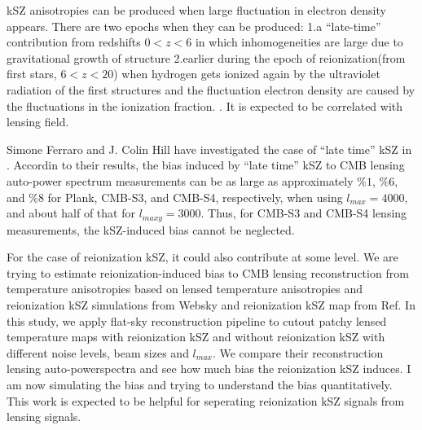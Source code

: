 \documentclass[12pt, notitlepage, onecolumn, amsmath, amssymb, aps]{revtex4-1}
\begin{document}
kSZ anisotropies can be produced when large fluctuation in electron density appears. There are two epochs when they can be produced: 1.a ``late-time'' contribution from redshifts \(0<z<6\) in which inhomogeneities are large due to gravitational growth of structure 2.earlier during the epoch of reionization(from first stars, \(6<z<20\)) when hydrogen gets ionized again by the ultraviolet radiation of the first structures and the fluctuation electron density are caused by the fluctuations in the ionization fraction.\cite{Ferraro:2017fac} \cite{Alvarez:2015xzu}. It is expected to be correlated with lensing field.

Simone Ferraro and J. Colin Hill  have investigated the case of ``late time'' kSZ in \cite{Ferraro:2017fac}. Accordin to their results, the bias induced by ``late time'' kSZ to CMB lensing auto-power spectrum measurements can be as large as approximately \(\%1\), \(\%6\), and \(\%8\) for Plank, CMB-S3, and CMB-S4, respectively, when using \(l_{max} = 4000\), and about half of that for \(l_{maxy} = 3000\). Thus, for CMB-S3 and CMB-S4 lensing measurements, the kSZ-induced bias cannot be neglected.

For the case of reionization kSZ, it could also contribute at some level. We are trying to estimate reionization-induced bias to CMB lensing reconstruction from temperature anisotropies based on lensed temperature anisotropies and reionization kSZ simulations from Websky\cite{Stein:2020its} and reionization kSZ map from Ref\cite{Alvarez:2015xzu}. In this study, we apply flat-sky reconstruction pipeline to cutout patchy lensed temperature maps with reionization kSZ and without reionization kSZ with different noise levels, beam sizes and \(l_{max}\). We compare their reconstruction lensing auto-powerspectra and see how much bias the reionization kSZ induces.
I am now simulating the bias and trying to understand the bias quantitatively. This work is expected to be helpful for seperating reionization kSZ signals from lensing signals.




\end{document}
